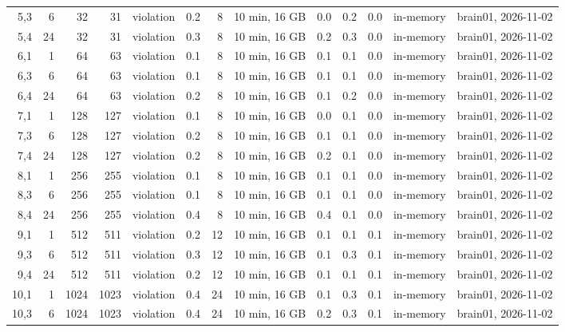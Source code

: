 \documentclass[10pt]{article}
\begin{document}
\begin{longtable}{@{}rrrrlrrlrrrrl@{}}
\color{red} 5,3 & 6 & 32 & 31 & violation & 0.2 & 8 & 10 min, 16 GB & 0.0 & 0.2 & 0.0 & in-memory & brain01, 2026-11-02 \\
\color{red} 5,4 & 24 & 32 & 31 & violation & 0.3 & 8 & 10 min, 16 GB & 0.2 & 0.3 & 0.0 & in-memory & brain01, 2026-11-02 \\
\color{red} 6,1 & 1 & 64 & 63 & violation & 0.1 & 8 & 10 min, 16 GB & 0.1 & 0.1 & 0.0 & in-memory & brain01, 2026-11-02 \\
\color{red} 6,3 & 6 & 64 & 63 & violation & 0.1 & 8 & 10 min, 16 GB & 0.1 & 0.1 & 0.0 & in-memory & brain01, 2026-11-02 \\
\color{red} 6,4 & 24 & 64 & 63 & violation & 0.2 & 8 & 10 min, 16 GB & 0.1 & 0.2 & 0.0 & in-memory & brain01, 2026-11-02 \\
\color{red} 7,1 & 1 & 128 & 127 & violation & 0.1 & 8 & 10 min, 16 GB & 0.0 & 0.1 & 0.0 & in-memory & brain01, 2026-11-02 \\
\color{red} 7,3 & 6 & 128 & 127 & violation & 0.2 & 8 & 10 min, 16 GB & 0.1 & 0.1 & 0.0 & in-memory & brain01, 2026-11-02 \\
\color{red} 7,4 & 24 & 128 & 127 & violation & 0.2 & 8 & 10 min, 16 GB & 0.2 & 0.1 & 0.0 & in-memory & brain01, 2026-11-02 \\
\color{red} 8,1 & 1 & 256 & 255 & violation & 0.1 & 8 & 10 min, 16 GB & 0.1 & 0.1 & 0.0 & in-memory & brain01, 2026-11-02 \\
\color{red} 8,3 & 6 & 256 & 255 & violation & 0.1 & 8 & 10 min, 16 GB & 0.1 & 0.1 & 0.0 & in-memory & brain01, 2026-11-02 \\
\color{red} 8,4 & 24 & 256 & 255 & violation & 0.4 & 8 & 10 min, 16 GB & 0.4 & 0.1 & 0.0 & in-memory & brain01, 2026-11-02 \\
\color{red} 9,1 & 1 & 512 & 511 & violation & 0.2 & 12 & 10 min, 16 GB & 0.1 & 0.1 & 0.1 & in-memory & brain01, 2026-11-02 \\
\color{red} 9,3 & 6 & 512 & 511 & violation & 0.3 & 12 & 10 min, 16 GB & 0.1 & 0.3 & 0.1 & in-memory & brain01, 2026-11-02 \\
\color{red} 9,4 & 24 & 512 & 511 & violation & 0.2 & 12 & 10 min, 16 GB & 0.1 & 0.1 & 0.1 & in-memory & brain01, 2026-11-02 \\
\color{red} 10,1 & 1 & 1024 & 1023 & violation & 0.4 & 24 & 10 min, 16 GB & 0.1 & 0.3 & 0.1 & in-memory & brain01, 2026-11-02 \\
\color{red} 10,3 & 6 & 1024 & 1023 & violation & 0.4 & 24 & 10 min, 16 GB & 0.2 & 0.3 & 0.1 & in-memory & brain01, 2026-11-02 \\

\end{longtable}
\end{document}
